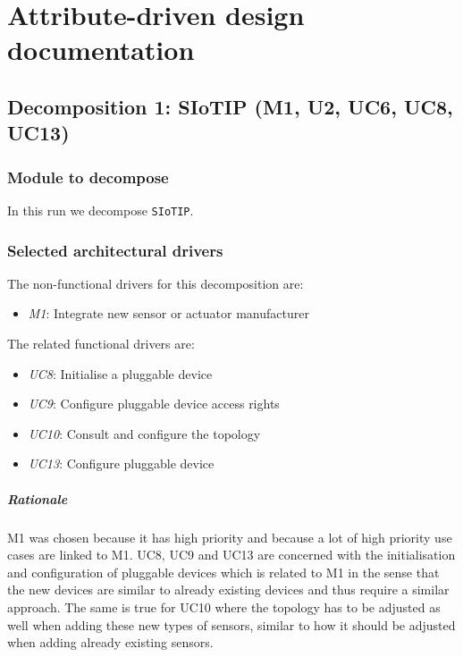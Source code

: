 \documentclass[english]{sareport}
\begin{document}
\maketitle

\tableofcontents


\chapter{Attribute-driven design documentation}\label{sec:add}
\section{Decomposition 1: SIoTIP (M1, U2, UC6, UC8, UC13)}
\subsection{Module to decompose}
In this run we decompose \texttt{SIoTIP}.

\subsection{Selected architectural drivers}
The non-functional drivers for this decomposition are:

\begin{itemize}
	\item \emph{M1}: Integrate new sensor or actuator manufacturer
\end{itemize}
The related functional drivers are:

\begin{itemize}
	\item \emph{UC8}: Initialise a pluggable device
	\item \emph{UC9}: Configure pluggable device access rights
	\item \emph{UC10}: Consult and configure the topology
	\item \emph{UC13}: Configure pluggable device
\end{itemize}

\paragraph{Rationale}
M1 was chosen because it has high priority and because a lot of high priority use cases are linked to M1. UC8, UC9 and UC13 are concerned with the initialisation and configuration of pluggable devices which is related to M1 in the sense that the new devices are similar to already existing devices and thus require a similar approach. The same is true for UC10 where the topology has to be adjusted as well when adding these new types of sensors, similar to how it should be adjusted when adding already existing sensors. 
\end{document}
